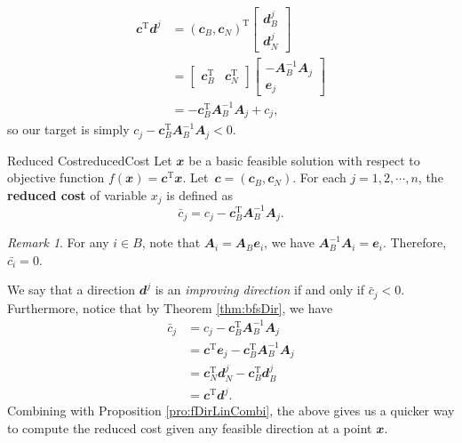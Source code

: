\documentclass[math, code]{amznotes}
\theoremstyle{remark}
\newtheorem*{remark}{Remark}
\begin{document}
\begin{align*}
    \mathbfit{c}^{\mathrm{T}}\mathbfit{d}^j & = \left(\mathbfit{c}_B, \mathbfit{c}_N\right)^{\mathrm{T}}\begin{bmatrix}
        \mathbfit{d}^j_B \\
        \mathbfit{d}^j_N
    \end{bmatrix} \\
    & = \begin{bmatrix}
        \mathbfit{c}_B^{\mathrm{T}} & \mathbfit{c}_N^{\mathrm{T}}
    \end{bmatrix}\begin{bmatrix}
        -\mathbfit{A}_B^{-1}\mathbfit{A}_j \\
        \mathbfit{e}_j
    \end{bmatrix} \\
    & = -\mathbfit{c}_B^{\mathrm{T}}\mathbfit{A}_B^{-1}\mathbfit{A}_j + c_j,
\end{align*}
so our target is simply $c_j - \mathbfit{c}_B^{\mathrm{T}}\mathbfit{A}_B^{-1}\mathbfit{A}_j < 0$.
\begin{dfnbox}{Reduced Cost}{reducedCost}
    Let $\mathbfit{x}$ be a basic feasible solution with respect to objective function $f(\mathbfit{x}) = \mathbfit{c}^{\mathrm{T}}\mathbfit{x}$. Let~$\mathbfit{c} = \left(\mathbfit{c}_B, \mathbfit{c}_N\right)$. For each $j = 1, 2, \cdots, n$, the {\color{red} \textbf{reduced cost}} of variable $x_j$ is defined as 
    \begin{equation*}
        \bar{c}_j = c_j - \mathbfit{c}_B^{\mathrm{T}}\mathbfit{A}_B^{-1}\mathbfit{A}_j.
    \end{equation*}
\end{dfnbox}
\begin{notebox}
    \begin{remark}
        For any $i \in B$, note that $\mathbfit{A}_i = \mathbfit{A}_B\mathbfit{e}_i$, we have $\mathbfit{A}_B^{-1}\mathbfit{A}_i = \mathbfit{e}_i$. Therefore, $\bar{c_i} = 0$.
    \end{remark}
\end{notebox}
We say that a direction $\mathbfit{d}^j$ is an \textit{improving direction} if and only if $\bar{c}_j < 0$. Furthermore, notice that by Theorem \ref{thm:bfsDir}, we have
\begin{align*}
    \bar{c}_j & = c_j - \mathbfit{c}_B^{\mathrm{T}}\mathbfit{A}_B^{-1}\mathbfit{A}_j \\
    & = \mathbfit{c}^{\mathrm{T}}\mathbfit{e}_j - \mathbfit{c}_B^{\mathrm{T}}\mathbfit{A}_B^{-1}\mathbfit{A}_j \\
    & = \mathbfit{c}_N^{\mathrm{T}}\mathbfit{d}_N^j - \mathbfit{c}_B^{\mathrm{T}}\mathbfit{d}_B^j \\
    & = \mathbfit{c}^{\mathrm{T}}\mathbfit{d}^j.
\end{align*}
Combining with Proposition \ref{pro:fDirLinCombi}, the above gives us a quicker way to compute the reduced cost given any feasible direction at a point $\mathbfit{x}$.
\end{document}
